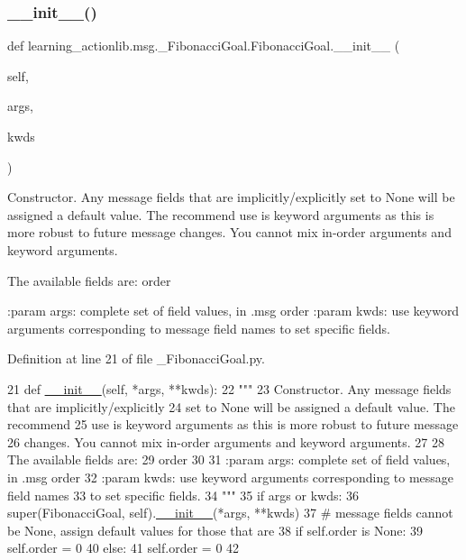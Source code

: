 \subsubsection{\texorpdfstring{\+\_\+\+\_\+init\+\_\+\+\_\+()}{\_\_init\_\_()}}
{\footnotesize\ttfamily def learning\+\_\+actionlib.\+msg.\+\_\+\+Fibonacci\+Goal.\+Fibonacci\+Goal.\+\_\+\+\_\+init\+\_\+\+\_\+ (\begin{DoxyParamCaption}\item[{}]{self,  }\item[{}]{args,  }\item[{}]{kwds }\end{DoxyParamCaption})}

\begin{DoxyVerb}Constructor. Any message fields that are implicitly/explicitly
set to None will be assigned a default value. The recommend
use is keyword arguments as this is more robust to future message
changes.  You cannot mix in-order arguments and keyword arguments.

The available fields are:
   order

:param args: complete set of field values, in .msg order
:param kwds: use keyword arguments corresponding to message field names
to set specific fields.
\end{DoxyVerb}
 

Definition at line 21 of file \+\_\+\+Fibonacci\+Goal.\+py.


\begin{DoxyCode}
21   \textcolor{keyword}{def }\hyperlink{classstate__machine_1_1Play_a5993a23d8be7f7b2647f71ede0334957}{\_\_init\_\_}(self, *args, **kwds):
22     \textcolor{stringliteral}{"""}
23 \textcolor{stringliteral}{    Constructor. Any message fields that are implicitly/explicitly}
24 \textcolor{stringliteral}{    set to None will be assigned a default value. The recommend}
25 \textcolor{stringliteral}{    use is keyword arguments as this is more robust to future message}
26 \textcolor{stringliteral}{    changes.  You cannot mix in-order arguments and keyword arguments.}
27 \textcolor{stringliteral}{}
28 \textcolor{stringliteral}{    The available fields are:}
29 \textcolor{stringliteral}{       order}
30 \textcolor{stringliteral}{}
31 \textcolor{stringliteral}{    :param args: complete set of field values, in .msg order}
32 \textcolor{stringliteral}{    :param kwds: use keyword arguments corresponding to message field names}
33 \textcolor{stringliteral}{    to set specific fields.}
34 \textcolor{stringliteral}{    """}
35     \textcolor{keywordflow}{if} args \textcolor{keywordflow}{or} kwds:
36       super(FibonacciGoal, self).\hyperlink{classstate__machine_1_1Play_a5993a23d8be7f7b2647f71ede0334957}{\_\_init\_\_}(*args, **kwds)
37       \textcolor{comment}{# message fields cannot be None, assign default values for those that are}
38       \textcolor{keywordflow}{if} self.order \textcolor{keywordflow}{is} \textcolor{keywordtype}{None}:
39         self.order = 0
40     \textcolor{keywordflow}{else}:
41       self.order = 0
42 
\end{DoxyCode}


